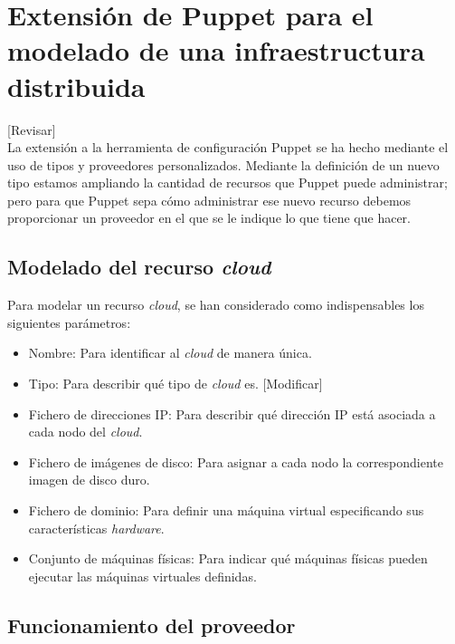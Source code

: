 \chapter{Extensión de Puppet para el modelado de una infraestructura distribuida}
\label{cap:trabajo}

[Revisar]\\

La extensión a la herramienta de configuración Puppet se ha hecho mediante el uso de tipos y proveedores personalizados. Mediante la definición de un nuevo tipo estamos ampliando la cantidad de recursos que Puppet puede administrar; pero para que Puppet sepa cómo administrar ese nuevo recurso debemos proporcionar un proveedor en el que se le indique lo que tiene que hacer.


\section{Modelado del recurso \emph{cloud}}

Para modelar un recurso \emph{cloud}, se han considerado como indispensables los siguientes parámetros:
\begin{itemize}
\item Nombre: Para identificar al \emph{cloud} de manera única.
\item Tipo: Para describir qué tipo de \emph{cloud} es. [Modificar]
\item Fichero de direcciones IP: Para describir qué dirección IP está asociada a cada nodo del \emph{cloud}.
\item Fichero de imágenes de disco: Para asignar a cada nodo la correspondiente imagen de disco duro.
\item Fichero de dominio: Para definir una máquina virtual especificando sus características \emph{hardware}.
\item Conjunto de máquinas físicas: Para indicar qué máquinas físicas pueden ejecutar las máquinas virtuales definidas.
\end{itemize}


\section{Funcionamiento del proveedor}

